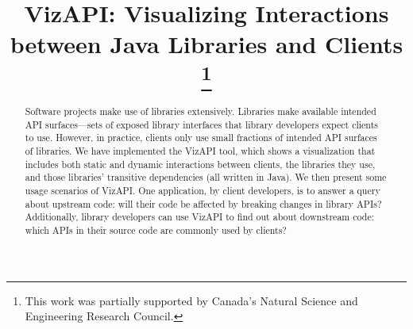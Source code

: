 \documentclass[conference]{IEEEtran}
\begin{document}
\title{VizAPI: Visualizing Interactions between Java Libraries and Clients
\thanks{This work was partially supported by Canada's Natural Science and Engineering Research Council.}
}



\author{
}
\maketitle

\begin{abstract}
Software projects make use of libraries extensively. Libraries make available intended API surfaces—sets of exposed library interfaces that library developers expect clients to use. However, in practice, clients only use small fractions of intended API surfaces of libraries. We have implemented the VizAPI tool, which shows a visualization that includes both static and dynamic interactions between clients, the libraries they use, and  those libraries’ transitive dependencies (all written in Java). We then present some usage scenarios of VizAPI. One application, by client developers, is to answer a query about upstream code: will their code be affected by breaking changes in library APIs? Additionally, library developers can use VizAPI to find out about downstream code: which APIs in their source code are commonly used by clients? 
\end{abstract}
\end{document}

